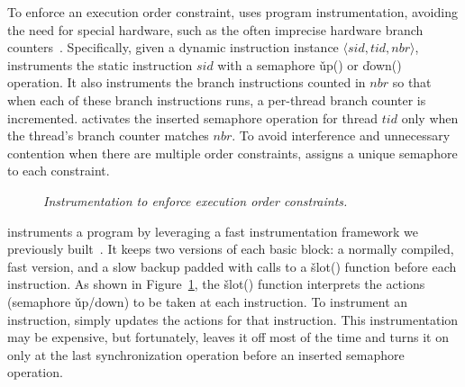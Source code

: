 
To enforce an execution order constraint, \peregrine uses program
instrumentation, avoiding the need for special hardware, such as the often
imprecise hardware branch counters~\cite{smp-revirt:vee08}.
Specifically, given a dynamic instruction instance $\langle sid, tid, nbr \rangle$, \peregrine
instruments the static instruction $sid$ with a semaphore \v{up()} or
\v{down()} operation. 
It also instruments the branch instructions counted in $nbr$ so that when
each of these branch instructions runs, a per-thread branch counter is
incremented.  \peregrine activates the inserted semaphore operation for thread
$tid$ only when the thread's branch counter matches $nbr$.  To avoid
interference and unnecessary contention when there are multiple order
constraints, \peregrine assigns a unique semaphore to each constraint.

\begin{figure}[t]
\centering
\begin{minipage}{0.45\textwidth}
\tiny {}
\end{minipage}
\vspace{-.1in}
\caption{\emph{Instrumentation to enforce execution order
    constraints.}} \label{fig:slot}
\vspace{-.1in}
\end{figure}

\peregrine instruments a program by leveraging a fast instrumentation framework we
previously built~\cite{wu:loom:osdi10}.  It keeps two versions of each
basic block: a normally compiled, fast version, and a slow backup
padded with calls to a \v{slot()} function before each instruction.  As
shown in Figure~\ref{fig:slot}, the \v{slot()} function interprets the
actions (semaphore \v{up/down}) to be taken at each instruction.  To
instrument an instruction, \peregrine simply updates the actions for that 
instruction.  This instrumentation may be expensive, but fortunately, \peregrine
leaves it off most of the time and turns it on only at the last
synchronization operation before an inserted semaphore operation.

